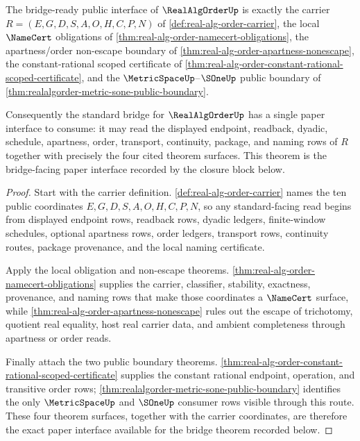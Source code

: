 \begin{theorem}
\label{thm:real-alg-order-bridge-ready-public-interface}
The bridge-ready public interface of $\RealAlgOrderUp$ is exactly the carrier $R=(E,G,D,S,A,O,H,C,P,N)$ of \autoref{def:real-alg-order-carrier}, the local $\NameCert$ obligations of \autoref{thm:real-alg-order-namecert-obligations}, the apartness/order non-escape boundary of \autoref{thm:real-alg-order-apartness-nonescape}, the constant-rational scoped certificate of \autoref{thm:real-alg-order-constant-rational-scoped-certificate}, and the $\MetricSpaceUp$--$\SOneUp$ public boundary of \autoref{thm:realalgorder-metric-sone-public-boundary}.

Consequently the standard bridge for $\RealAlgOrderUp$ has a single paper interface to consume: it may read the displayed endpoint, readback, dyadic, schedule, apartness, order, transport, continuity, package, and naming rows of $R$ together with precisely the four cited theorem surfaces. This theorem is the bridge-facing paper interface recorded by the closure block below.
\end{theorem}
\begin{proof}
Start with the carrier definition. \autoref{def:real-alg-order-carrier} names the ten public coordinates $E,G,D,S,A,O,H,C,P,N$, so any standard-facing read begins from displayed endpoint rows, readback rows, dyadic ledgers, finite-window schedules, optional apartness rows, order ledgers, transport rows, continuity routes, package provenance, and the local naming certificate.

Apply the local obligation and non-escape theorems. \autoref{thm:real-alg-order-namecert-obligations} supplies the carrier, classifier, stability, exactness, provenance, and naming rows that make those coordinates a $\NameCert$ surface, while \autoref{thm:real-alg-order-apartness-nonescape} rules out the escape of trichotomy, quotient real equality, host real carrier data, and ambient completeness through apartness or order reads.

Finally attach the two public boundary theorems. \autoref{thm:real-alg-order-constant-rational-scoped-certificate} supplies the constant rational endpoint, operation, and transitive order rows; \autoref{thm:realalgorder-metric-sone-public-boundary} identifies the only $\MetricSpaceUp$ and $\SOneUp$ consumer rows visible through this route. These four theorem surfaces, together with the carrier coordinates, are therefore the exact paper interface available for the bridge theorem recorded below.
\end{proof}


